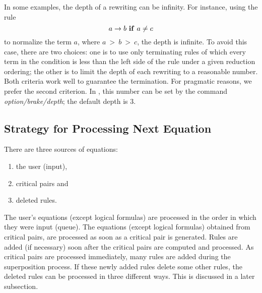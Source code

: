 In some examples, the depth of a rewriting can be infinity. 
For instance, using the rule 
\[ a \rightarrow b ~{\bf if}~ a \neq c\]
to normalize the term $a$, 
where $a~ >~ b~ >~ c$, the depth is infinite. 
To avoid this case,
there are two choices:
one is to use only terminating rules of which
every term in the condition is less than the left side of the rule
under a given reduction ordering; 
the other
is to limit the depth of each rewriting to a reasonable number.
Both criteria work well to guarantee the termination.
For pragmatic reasons, we prefer the second criterion.
In \ERRL, this number can be set by the command 
{\em option/brake/depth}; the default depth is 3.

\subsection{Strategy for Processing Next Equation}

There are three sources of equations: 
\begin{enumerate}
\item the user (input), 
\item critical pairs and 
\item deleted rules.
\end{enumerate}
  
The user's equations (except logical formulas) are processed in the
order in which they were input (queue).  The equations (except logical
formulas) obtained from critical pairs, are processed as soon as a
critical pair is generated. Rules are added (if necessary) soon after
the critical pairs are computed and processed.  As critical pairs are
processed immediately, many rules are added during the superposition
process. If these newly added rules delete some other rules, the
deleted rules can be processed in three different ways. This is
discussed in a later subsection.

